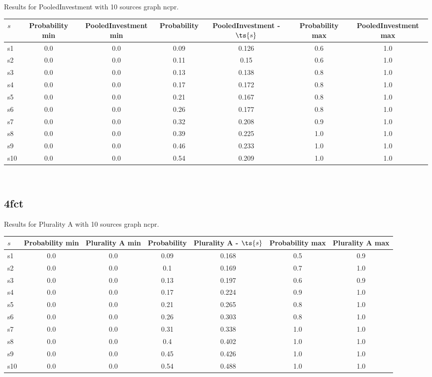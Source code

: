 \documentclass{article}
\begin{document}
\noindent Results for PooledInvestment with 10 sources graph ncpr.

\noindent\begin{tabular}{|l|c|c|c|c|c|c|}
\hline
$s$& Probability min & PooledInvestment min & Probability & PooledInvestment - $\ts{s}$ & Probability max & PooledInvestment max\\
\hline
s1 &0.0 & 0.0 & 0.09 & 0.126 & 0.6 & 1.0\\
\hline
s2 &0.0 & 0.0 & 0.11 & 0.15 & 0.6 & 1.0\\
\hline
s3 &0.0 & 0.0 & 0.13 & 0.138 & 0.8 & 1.0\\
\hline
s4 &0.0 & 0.0 & 0.17 & 0.172 & 0.8 & 1.0\\
\hline
s5 &0.0 & 0.0 & 0.21 & 0.167 & 0.8 & 1.0\\
\hline
s6 &0.0 & 0.0 & 0.26 & 0.177 & 0.8 & 1.0\\
\hline
s7 &0.0 & 0.0 & 0.32 & 0.208 & 0.9 & 1.0\\
\hline
s8 &0.0 & 0.0 & 0.39 & 0.225 & 1.0 & 1.0\\
\hline
s9 &0.0 & 0.0 & 0.46 & 0.233 & 1.0 & 1.0\\
\hline
s10 &0.0 & 0.0 & 0.54 & 0.209 & 1.0 & 1.0\\
\hline
\end{tabular}\\

\newpage

\subsection{4fct}

\noindent Results for Plurality A with 10 sources graph ncpr.

\noindent\begin{tabular}{|l|c|c|c|c|c|c|}
\hline
$s$& Probability min & Plurality A min & Probability & Plurality A - $\ts{s}$ & Probability max & Plurality A max\\
\hline
s1 &0.0 & 0.0 & 0.09 & 0.168 & 0.5 & 0.9\\
\hline
s2 &0.0 & 0.0 & 0.1 & 0.169 & 0.7 & 1.0\\
\hline
s3 &0.0 & 0.0 & 0.13 & 0.197 & 0.6 & 0.9\\
\hline
s4 &0.0 & 0.0 & 0.17 & 0.224 & 0.9 & 1.0\\
\hline
s5 &0.0 & 0.0 & 0.21 & 0.265 & 0.8 & 1.0\\
\hline
s6 &0.0 & 0.0 & 0.26 & 0.303 & 0.8 & 1.0\\
\hline
s7 &0.0 & 0.0 & 0.31 & 0.338 & 1.0 & 1.0\\
\hline
s8 &0.0 & 0.0 & 0.4 & 0.402 & 1.0 & 1.0\\
\hline
s9 &0.0 & 0.0 & 0.45 & 0.426 & 1.0 & 1.0\\
\hline
s10 &0.0 & 0.0 & 0.54 & 0.488 & 1.0 & 1.0\\
\hline
\end{tabular}\\
\end{document}
